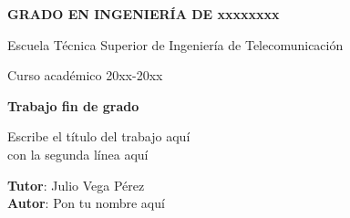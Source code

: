 \thispagestyle{empty}
\vspace{2cm}

\begin{figure}[htb]
  \centerline{}
\end{figure}

\begin{center}
  {\Large {\bf GRADO EN INGENIERÍA DE xxxxxxxx}}
  \vspace{5mm}
 
  {\large {Escuela Técnica Superior de Ingeniería de Telecomunicación}}
  \vspace{5mm}

  {\large {Curso académico 20xx-20xx}}

  \vspace{1cm}

  {\large {\bf Trabajo fin de grado}}

  \vspace{2cm}

  {\Large {Escribe el título del trabajo aquí\\
               con la segunda línea aquí\\[1cm] }}

  \vspace{5cm}
  {\bf Tutor}: Julio Vega Pérez \\
  {\bf Autor}: Pon tu nombre aquí
\end{center}

\clearpage
\thispagestyle{empty}
